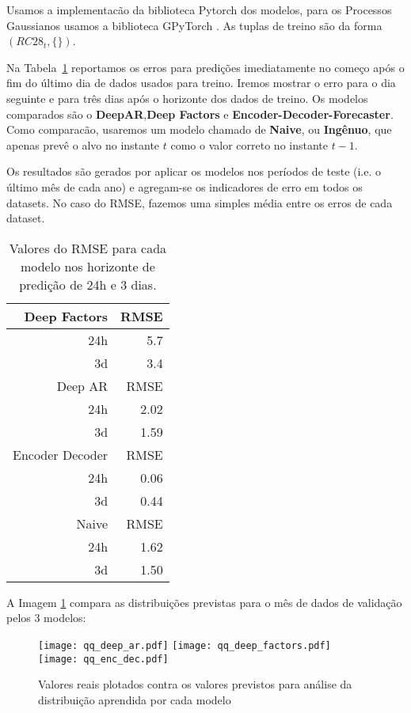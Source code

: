 Usamos a implementacão da biblioteca Pytorch \cite{pytorch} dos modelos, para os Processos Gaussianos usamos a biblioteca GPyTorch \cite{gpytorch}. As tuplas de treino são da forma $(RC28_{t},\{\})$. 

Na Tabela~\ref{tb:rmse} reportamos os erros para predições imediatamente no
começo após o fim do último dia de dados usados para treino. Iremos mostrar o
erro para o dia seguinte e para três dias após o horizonte dos dados de treino.
Os modelos comparados são o \textbf{DeepAR},\textbf{Deep Factors} e
\textbf{Encoder-Decoder-Forecaster}. Como comparacão, usaremos um modelo chamado
de \textbf{Naive}, ou \textbf{Ingênuo}, que apenas prevê o alvo no instante $t$ como o valor
correto no instante $t-1$.

Os resultados são gerados por aplicar os modelos nos períodos de teste (i.e. o
último mês de cada ano) e agregam-se os indicadores de erro em todos os
datasets. No caso do RMSE, fazemos uma simples média entre os erros de cada
dataset.

\begin{center}
\begin{table}[htbp]
\caption{Valores do RMSE para cada modelo nos horizonte de predição de 24h e 3 dias.}
\centering
\begin{tabular}{rr}
\hline
Deep Factors & RMSE\\
\hline
24h & 5.7\\
3d & 3.4\\
\hline
Deep AR & RMSE\\
\hline
  24h & 2.02 \\
3d & 1.59\\
\hline
Encoder Decoder & RMSE\\
\hline
24h & 0.06\\
3d & 0.44\\
\hline
Naive & RMSE\\
\hline
24h & 1.62\\
3d & 1.50\\
\end{tabular}

\label{tb:rmse}
\end{table}
\end{center}

A Imagem \ref{fig:distr} compara as distribuições previstas para o mês
de dados de validação pelos 3 modelos:

\begin{figure}[H]
\centering
\texttt{[image: qq\_deep\_ar.pdf]} \hfill
\texttt{[image: qq\_deep\_factors.pdf]} \hfill
\texttt{[image: qq\_enc\_dec.pdf]} 
\caption{Valores reais plotados contra os valores previstos para análise da distribuição aprendida por cada modelo} 
\label{fig:distr}
\end{figure}


